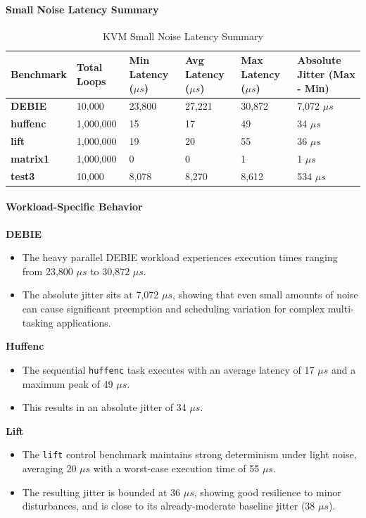 \paragraph{Small Noise Latency
Summary}\label{small-noise-latency-summary}

\begin{table}
\centering
\caption{KVM Small Noise Latency Summary}
\label{tab:kvm:small-noise}
\begin{tabularx}{\linewidth}{@{}YYYYYY@{}}
\toprule
Benchmark & Total Loops & Min Latency ($\mu s$) & Avg Latency ($\mu s$) & Max Latency ($\mu s$) & Absolute Jitter (Max - Min)\tabularnewline
\midrule
\textbf{DEBIE} & 10,000 & 23,800 & 27,221 & 30,872 & 7,072 $\mu s$\tabularnewline
\textbf{huffenc} & 1,000,000 & 15 & 17 & 49 & 34 $\mu s$\tabularnewline
\textbf{lift} & 1,000,000 & 19 & 20 & 55 & 36 $\mu s$\tabularnewline
\textbf{matrix1} & 1,000,000 & 0 & 0 & 1 & 1 $\mu s$\tabularnewline
\textbf{test3} & 10,000 & 8,078 & 8,270 & 8,612 & 534 $\mu s$\tabularnewline
\bottomrule
\end{tabularx}
\end{table}

\paragraph{Workload-Specific
Behavior}\label{workload-specific-behavior-1}

\textbf{DEBIE}

\begin{itemize}
\item
  The heavy parallel DEBIE workload experiences execution times ranging
  from 23,800 $\mu s$ to 30,872 $\mu s$.
\item
  The absolute jitter sits at 7,072 $\mu s$, showing that even small amounts
  of noise can cause significant preemption and scheduling variation for
  complex multi-tasking applications.
\end{itemize}

\textbf{Huffenc}

\begin{itemize}
\item
  The sequential \texttt{huffenc} task executes with an average latency
  of 17 $\mu s$ and a maximum peak of 49 $\mu s$.
\item
  This results in an absolute jitter of 34 $\mu s$.
\end{itemize}

\textbf{Lift}

\begin{itemize}
\item
  The \texttt{lift} control benchmark maintains strong determinism under
  light noise, averaging 20 $\mu s$ with a worst-case execution time of 55
  $\mu s$.
\item
  The resulting jitter is bounded at 36 $\mu s$, showing good resilience to
  minor disturbances, and is close to its already-moderate baseline
  jitter (38 $\mu s$).
\end{itemize}

